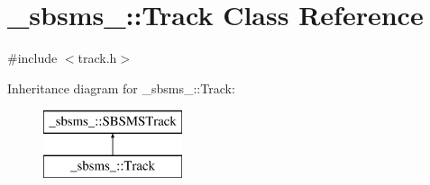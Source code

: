 \hypertarget{class__sbsms___1_1_track}{}\section{\+\_\+sbsms\+\_\+\+:\+:Track Class Reference}
\label{class__sbsms___1_1_track}


{\ttfamily \#include $<$track.\+h$>$}

Inheritance diagram for \+\_\+sbsms\+\_\+\+:\+:Track\+:\begin{figure}[H]
\begin{center}
\leavevmode
\includegraphics[height=2.000000cm]{class__sbsms___1_1_track}
\end{center}
\end{figure}
